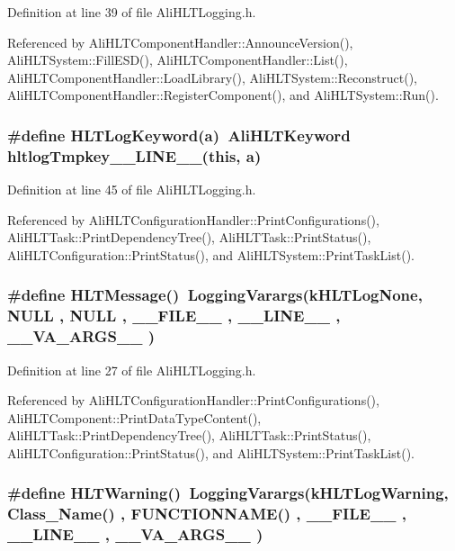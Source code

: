 Definition at line 39 of file Ali\-HLTLogging.h.

Referenced by Ali\-HLTComponent\-Handler::Announce\-Version(), Ali\-HLTSystem::Fill\-ESD(), Ali\-HLTComponent\-Handler::List(), Ali\-HLTComponent\-Handler::Load\-Library(), Ali\-HLTSystem::Reconstruct(), Ali\-HLTComponent\-Handler::Register\-Component(), and Ali\-HLTSystem::Run().
\subsubsection{\setlength{\rightskip}{0pt plus 5cm}\#define HLTLog\-Keyword(a)\ {\bf Ali\-HLTKeyword} hltlog\-Tmpkey\_\-\_\-LINE\_\-\_\-(this, a)}\label{AliHLTLogging_8h_a8}




Definition at line 45 of file Ali\-HLTLogging.h.

Referenced by Ali\-HLTConfiguration\-Handler::Print\-Configurations(), Ali\-HLTTask::Print\-Dependency\-Tree(), Ali\-HLTTask::Print\-Status(), Ali\-HLTConfiguration::Print\-Status(), and Ali\-HLTSystem::Print\-Task\-List().
\subsubsection{\setlength{\rightskip}{0pt plus 5cm}\#define HLTMessage()\ Logging\-Varargs(k\-HLTLog\-None,      NULL , NULL , \_\-\_\-FILE\_\-\_\- , \_\-\_\-LINE\_\-\_\- , \_\-\_\-VA\_\-ARGS\_\-\_\- )}\label{AliHLTLogging_8h_a0}




Definition at line 27 of file Ali\-HLTLogging.h.

Referenced by Ali\-HLTConfiguration\-Handler::Print\-Configurations(), Ali\-HLTComponent::Print\-Data\-Type\-Content(), Ali\-HLTTask::Print\-Dependency\-Tree(), Ali\-HLTTask::Print\-Status(), Ali\-HLTConfiguration::Print\-Status(), and Ali\-HLTSystem::Print\-Task\-List().
\subsubsection{\setlength{\rightskip}{0pt plus 5cm}\#define HLTWarning()\ Logging\-Varargs(k\-HLTLog\-Warning,   Class\_\-Name() , FUNCTIONNAME() , \_\-\_\-FILE\_\-\_\- , \_\-\_\-LINE\_\-\_\- , \_\-\_\-VA\_\-ARGS\_\-\_\- )}\label{AliHLTLogging_8h_a5}




